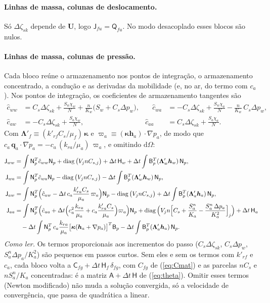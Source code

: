 \documentclass[11pt,a4paper]{article}
\newcommand{\vq}{\bm q}
\newcommand{\tkap}{\bm\kappa}
\newcommand{\mt}[1]{\mathsf{#1}}
\newcommand{\dd}{\mathrm d}
\begin{document}
\paragraph{Linhas de massa, colunas de deslocamento.} Só $\Delta\zeta_{sk}$ depende de
$\mathbf U$, logo $\mt J_{fu}=\mt Q_{fu}$. No modo desacoplado esses blocos são nulos.

\paragraph{Linhas de massa, colunas de pressão.} Cada bloco reúne o armazenamento nos pontos
de integração, o armazenamento concentrado, a condução e as derivadas da mobilidade (e, no
ar, do termo com $c_a$). Nos pontos de integração, os coeficientes de armazenamento
tangentes são
\begin{equation}
\begin{aligned}
\hat c_{ww}&=C_s\Delta\zeta_{sk}+\frac{S_w\chi_w}{N}+\frac{n}{K_w}\big(S_w+C_s\Delta p_w\big),&\quad
\hat c_{wa}&=-C_s\Delta\zeta_{sk}+\frac{S_w\chi_a}{N}-\frac{n}{K_w}\,C_s\Delta p_w,\\
\hat c_{aw}&=-C_s\Delta\zeta_{sk}+\frac{S_a\chi_w}{N},&
\hat c_{aa}&=C_s\Delta\zeta_{sk}+\frac{S_a\chi_a}{N}.
\end{aligned}
\label{eq:chat}
\end{equation}
Com $\bm\Lambda'_f\equiv(k'_{rf}C_s/\mu_f)\,\tkap$ e
$\varpi_a\equiv(\tkap\bm h_a)\cdot\nabla p_a$, de modo que
$c_a\,\vq_a\cdot\nabla p_a=-c_a\,(k_{ra}/\mu_a)\,\varpi_a$, e omitindo $\dd\Omega$:
\begin{align}
\mt J_{ww}&=\int\mt N_p^T\hat c_{ww}\mt N_p+\operatorname{diag}\big(V_jnC_{s,j}\big)
+\Delta t\,\mt H_w+\Delta t\int\mt B_p^T(\bm\Lambda'_w\bm h_w)\,\mt N_p,
\label{eq:Jww}\\
\mt J_{wa}&=\int\mt N_p^T\hat c_{wa}\mt N_p-\operatorname{diag}\big(V_jnC_{s,j}\big)
-\Delta t\int\mt B_p^T(\bm\Lambda'_w\bm h_w)\,\mt N_p,\\
\mt J_{aw}&=\int\mt N_p^T\Big(\hat c_{aw}-\Delta t\,c_a\frac{k'_{ra}C_s}{\mu_a}\,\varpi_a\Big)\mt N_p
-\operatorname{diag}\big(V_jnC_{s,j}\big)+\Delta t\int\mt B_p^T(\bm\Lambda'_a\bm h_a)\,\mt N_p,\\
\mt J_{aa}&=\int\mt N_p^T\Big(\hat c_{aa}+\Delta t\Big(c_a^2\frac{k_{ra}}{\mu_a}
+c_a\frac{k'_{ra}C_s}{\mu_a}\Big)\varpi_a\Big)\mt N_p
+\operatorname{diag}\Big(V_jn\Big[C_s+\frac{S_a^n}{K_a}-\frac{S_a^n\,\Delta p_a}{K_a^2}\Big]_j\Big)
+\Delta t\,\mt H_a\notag\\
&\quad-\Delta t\int\mt N_p^T\,c_a\frac{k_{ra}}{\mu_a}\big[\tkap(\bm h_a+\nabla p_a)\big]^T\mt B_p
-\Delta t\int\mt B_p^T(\bm\Lambda'_a\bm h_a)\,\mt N_p .
\label{eq:Jaa}
\end{align}
\emph{Como ler.} Os termos proporcionais aos incrementos do passo ($C_s\Delta\zeta_{sk}$,
$C_s\Delta p_w$, $S_a^n\Delta p_a/K_a^2$) são pequenos em passos curtos. Sem eles e sem os
termos com $k'_{rf}$ e $c_a$, cada bloco volta a $\mt C_{fg}+\Delta t\,\mt H_f\,\delta_{fg}$,
com $C_{fg}$ de (\ref{eq:Cmat}) e as parcelas $nC_s$ e $nS_a^n/K_a$ concentradas: é a
matriz $\mt A+\Delta t\,\mt H$ de (\ref{eq:theta}). Omitir esses termos (Newton modificado)
não muda a solução convergida, só a velocidade de convergência, que passa de quadrática a
linear.
\end{document}
